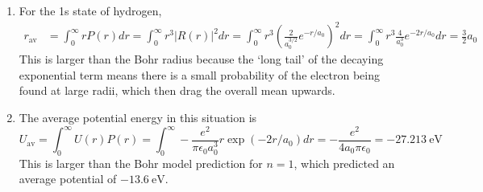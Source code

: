 \documentclass[10pt]{article}
\begin{document}
\begin{enumerate}
    \item For the 1s state of hydrogen,
    \begin{align*}
        r_{\text{av}} &= \int_0^\infty r P(r) dr = \int_0^\infty r^3 |R(r)|^2 dr =
        \int_0^\infty r^3 \left(\frac{2}{a_0^{3/2}}e^{-r/a_0}\right)^2 dr
        = \int_0^\infty r^3 \frac{4}{a_0^3}e^{-2r/a_0} dr = \frac{3}{2} a_0
      \end{align*}
      This is larger than the Bohr radius because the `long tail' of the decaying exponential term means there is a small probability of the electron being found at large radii, which then drag the overall mean upwards.

      \item The average potential energy in this situation is
      \begin{equation*}
          U_{\text{av}} = \int_0^\infty U(r)P(r) = \int_0^\infty -\frac{e^2}{\pi\epsilon_0a_0^3} r \exp(-2r/a_0) dr =
          -\frac{e^2}{4a_0\pi\epsilon_0} = \SI{-27.213}{\electronvolt}
      \end{equation*}
      This is larger than the Bohr model prediction for $n=1$, which predicted an average potential of $-\SI{13.6}{\electronvolt}$.
  \end{enumerate}
\end{document}
